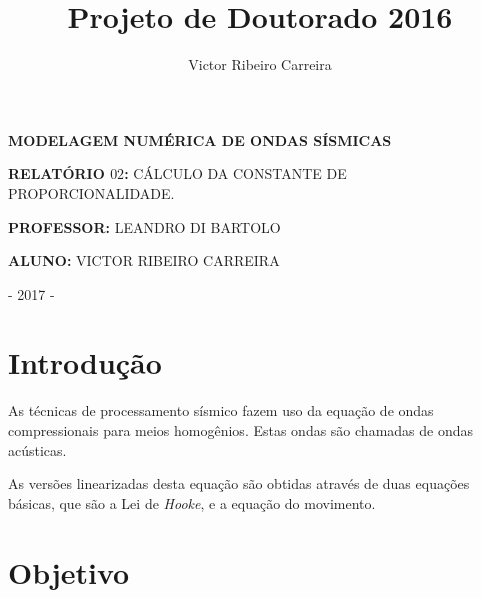 \documentclass[12pt,a4paper,final]{report}%
\author{Victor Ribeiro Carreira}
\title{Projeto de Doutorado 2016}
\begin{document}
\thispagestyle{empty}%


\begin{figure}[H]
\centering
{}
\end{figure}

\vspace{1cm}

\begin{center}
\textbf{MODELAGEM NUMÉRICA DE ONDAS SÍSMICAS}
\end{center}

\vspace{3cm}

\begin{center}
\textbf{RELATÓRIO $02$:} CÁLCULO DA CONSTANTE DE PROPORCIONALIDADE.
\end{center}

\vspace{2.5cm}

\begin{center}
\textbf{PROFESSOR:} LEANDRO DI BARTOLO
\end{center}

\begin{center}
\textbf{ALUNO:} VICTOR RIBEIRO CARREIRA
\end{center}

\vspace{10cm}

\begin{center}
- 2017 -
\end{center}



\pagebreak%
\section*{Introdução}


As técnicas de processamento sísmico fazem uso da equação de ondas compressionais para meios homogênios. Estas ondas são chamadas de ondas acústicas. 

As versões linearizadas desta equação são obtidas através de duas equações básicas, que são a Lei de \textit{Hooke}, e a equação do movimento.   


\section*{Objetivo}
\end{document}
